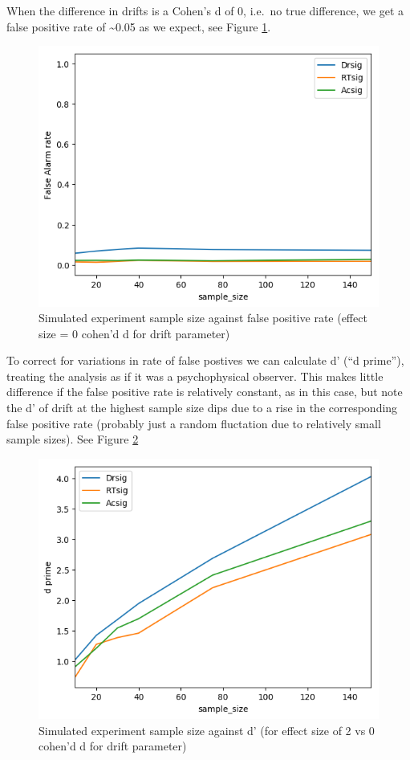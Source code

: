 \documentclass[floatsintext,doc]{apa6}
\theoremstyle{definition}
\theoremstyle{definition}
\theoremstyle{definition}
\theoremstyle{remark}
\begin{document}
When the difference in drifts is a Cohen's d of 0, i.e.~no true
difference, we get a false positive rate of \textasciitilde{}0.05 as we
expect, see Figure \ref{fig:vanillaFAs}.

\begin{figure}

{\centering \includegraphics[width=0.68\linewidth]{figs/FalseAlarms} 

}

\caption{Simulated experiment sample size against false positive rate (effect size = 0 cohen'd d for drift parameter)}\label{fig:vanillaFAs}
\end{figure}

To correct for variations in rate of false postives we can calculate d'
(\enquote{d prime}), treating the analysis as if it was a psychophysical
observer. This makes little difference if the false positive rate is
relatively constant, as in this case, but note the d' of drift at the
highest sample size dips due to a rise in the corresponding false
positive rate (probably just a random fluctation due to relatively small
sample sizes). See Figure \ref{fig:vanilladprime}

\begin{figure}

{\centering \includegraphics[width=0.68\linewidth]{figs/dprime} 

}

\caption{Simulated experiment sample size against d' (for effect size of 2 vs 0  cohen'd d for drift parameter)}\label{fig:vanilladprime}
\end{figure}
\end{document}

